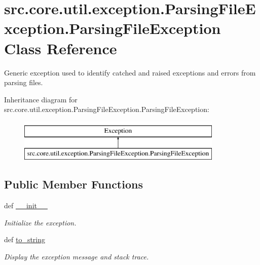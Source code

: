 \hypertarget{classsrc_1_1core_1_1util_1_1exception_1_1ParsingFileException_1_1ParsingFileException}{\section{src.\-core.\-util.\-exception.\-Parsing\-File\-Exception.\-Parsing\-File\-Exception Class Reference}
\label{classsrc_1_1core_1_1util_1_1exception_1_1ParsingFileException_1_1ParsingFileException}
}


Generic exception used to identify catched and raised exceptions and errors from parsing files.  


Inheritance diagram for src.\-core.\-util.\-exception.\-Parsing\-File\-Exception.\-Parsing\-File\-Exception\-:\begin{figure}[H]
\begin{center}
\leavevmode
\includegraphics[height=2.000000cm]{classsrc_1_1core_1_1util_1_1exception_1_1ParsingFileException_1_1ParsingFileException}
\end{center}
\end{figure}
\subsection*{Public Member Functions}
\begin{DoxyCompactItemize}
\item 
def \hyperlink{classsrc_1_1core_1_1util_1_1exception_1_1ParsingFileException_1_1ParsingFileException_a28fea306f2826166826226b6db68701d}{\-\_\-\-\_\-init\-\_\-\-\_\-}
\begin{DoxyCompactList}\small\item\em Initialize the exception. \end{DoxyCompactList}\item 
\hypertarget{classsrc_1_1core_1_1util_1_1exception_1_1ParsingFileException_1_1ParsingFileException_a6ed5ca60c595504de21b271e0ed3423d}{def \hyperlink{classsrc_1_1core_1_1util_1_1exception_1_1ParsingFileException_1_1ParsingFileException_a6ed5ca60c595504de21b271e0ed3423d}{to\-\_\-string}}\label{classsrc_1_1core_1_1util_1_1exception_1_1ParsingFileException_1_1ParsingFileException_a6ed5ca60c595504de21b271e0ed3423d}

\begin{DoxyCompactList}\small\item\em Display the exception message and stack trace. \end{DoxyCompactList}\end{DoxyCompactItemize}
